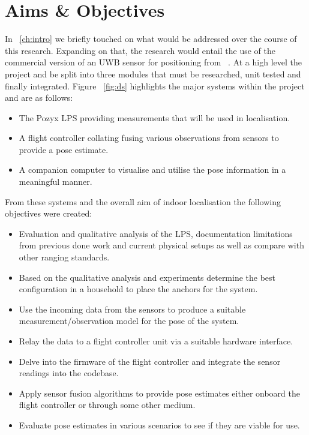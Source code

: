 \section{Aims \& Objectives}\label{sec:aims_objs}

    In ~\ref{ch:intro} we briefly touched on what would be addressed over the course of this research.
Expanding on that, the research would entail the use of the commercial version of an UWB sensor for positioning from ~\cite{pozyx2018pozyx}.
At a high level the project and be split into three modules that must be researched, unit tested and finally integrated.
Figure ~\ref{fig:ds} highlights the major systems within the project and are as follows:
\begin{itemize}
    \item The Pozyx LPS providing measurements that will be used in localisation.
    \item A flight controller collating fusing various observations from sensors to provide a pose estimate.
    \item A companion computer to visualise and utilise the pose information in a meaningful manner.
\end{itemize}

From these systems and the overall aim of indoor localisation the following objectives were created:
\begin{itemize}
    \item Evaluation and qualitative analysis of the LPS, documentation limitations from previous done work and current physical setups as well as compare with other ranging standards.
    \item Based on the qualitative analysis and experiments determine the best configuration in a household to place the anchors for the system.
    \item Use the incoming data from the sensors to produce a suitable measurement/observation model for the pose of the system.
    \item Relay the data to a flight controller unit via a suitable hardware interface.
    \item Delve into the firmware of the flight controller and integrate the sensor readings into the codebase.
    \item Apply sensor fusion algorithms to provide pose estimates either onboard the flight controller or through some other medium.
    \item Evaluate pose estimates in various scenarios to see if they are viable for use.
\end{itemize}

